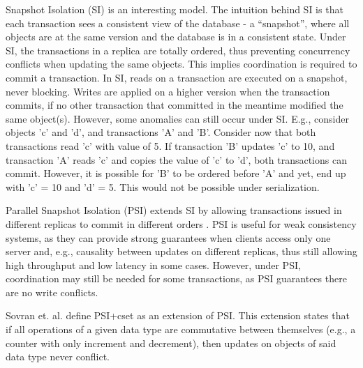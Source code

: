 Snapshot Isolation (SI) is an interesting model.
The intuition behind SI is that each transaction sees a consistent view of the database \cite{si} - a ``snapshot'', where all objects are at the same version and the database is in a consistent state.
Under SI, the transactions in a replica are totally ordered, thus preventing concurrency conflicts when updating the same objects.
This implies coordination is required to commit a transaction.
In SI, reads on a transaction are executed on a snapshot, never blocking.
Writes are applied on a higher version when the transaction commits, if no other transaction that committed in the meantime modified the same object(s).
However, some anomalies can still occur under SI.
E.g., consider objects 'c' and 'd', and transactions 'A' and 'B'.
Consider now that both transactions read 'c' with value of 5. 
If transaction 'B' updates 'c' to 10, and transaction 'A' reads 'c' and copies the value of 'c' to 'd', both transactions can commit.
However, it is possible for 'B' to be ordered before 'A' and yet, end up with 'c' = 10 and 'd' = 5.
This would not be possible under serialization.

Parallel Snapshot Isolation (PSI) extends SI by allowing transactions issued in different replicas to commit in different orders \cite{walter}.
PSI is useful for weak consistency systems, as they can provide strong guarantees when clients access only one server and, e.g., causality between updates on different replicas, thus still allowing high throughput and low latency in some cases.
However, under PSI, coordination may still be needed for some transactions, as PSI guarantees there are no write conflicts.

Sovran et. al. \cite{walter} define PSI+cset as an extension of PSI.
This extension states that if all operations of a given data type are commutative between themselves (e.g., a counter with only increment and decrement), then updates on objects of said data type never conflict.

